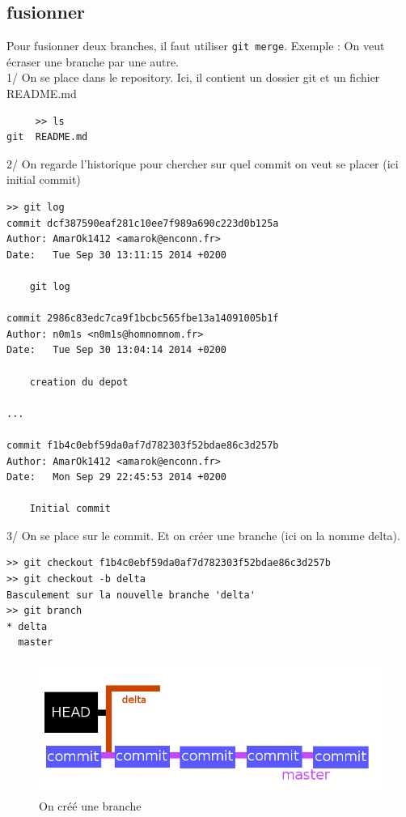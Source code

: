 \documentclass[a4paper,10pt]{report}
\begin{document}
     \subsection{fusionner}
     Pour fusionner deux branches, il faut utiliser \verb|git merge|.
     Exemple : On veut écraser une branche par une autre.\\
     1/ On se place dans le repository. Ici, il contient un dossier git et un fichier README.md
\begin{verbatim}
     >> ls
git  README.md
\end{verbatim}
     2/ On regarde l'historique pour chercher sur quel commit on veut se placer (ici initial commit)
\begin{verbatim}
>> git log
commit dcf387590eaf281c10ee7f989a690c223d0b125a
Author: AmarOk1412 <amarok@enconn.fr>
Date:   Tue Sep 30 13:11:15 2014 +0200

    git log

commit 2986c83edc7ca9f1bcbc565fbe13a14091005b1f
Author: n0m1s <n0m1s@homnomnom.fr>
Date:   Tue Sep 30 13:04:14 2014 +0200

    creation du depot

...

commit f1b4c0ebf59da0af7d782303f52bdae86c3d257b
Author: AmarOk1412 <amarok@enconn.fr>
Date:   Mon Sep 29 22:45:53 2014 +0200

    Initial commit
\end{verbatim}
    3/ On se place sur le commit. Et on créer une branche (ici on la nomme delta).
 \begin{verbatim}
>> git checkout f1b4c0ebf59da0af7d782303f52bdae86c3d257b
>> git checkout -b delta
Basculement sur la nouvelle branche 'delta'
>> git branch
* delta
  master
\end{verbatim}
\begin{figure}[h!]
  \begin{center}
    \includegraphics[scale=0.3]{images/3exp}
    \caption{On cr\'e\'e une branche}
    \label{3exp}
  \end{center}
\end{figure}
\end{document}
